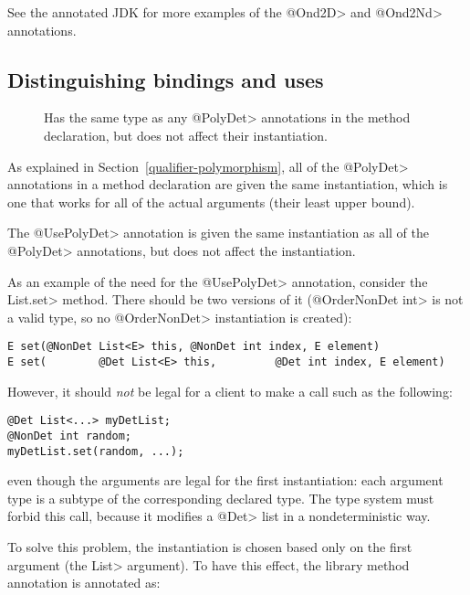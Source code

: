 See the annotated JDK for more examples of the \<@Ond2D> and \<@Ond2Nd>
annotations.


\subsection{Distinguishing bindings and uses\label{determinism-polymorphism-binding}}

\begin{description}
\item[]
  Has the same type as any \<@PolyDet> annotations in the method
  declaration, but does not affect their instantiation.
\end{description}

As explained in Section~\ref{qualifier-polymorphism},
all of the \<@PolyDet> annotations in a method declaration are given the same
instantiation, which is one that works for all of the actual arguments
(their least upper bound).

The \<@UsePolyDet> annotation is given the same instantiation as all of the
\<@PolyDet> annotations, but does not affect the instantiation.

As an example of the need for the \<@UsePolyDet> annotation, consider the
\<List.set> method.  There should be two versions of it (\<@OrderNonDet
int> is not a valid type, so no \<@OrderNonDet> instantiation is created):

\begin{Verbatim}
E set(@NonDet List<E> this, @NonDet int index, E element)
E set(        @Det List<E> this,         @Det int index, E element)
\end{Verbatim}

\noindent
However, it should \emph{not} be legal for a client to make a call such as
the following:

\begin{Verbatim}
@Det List<...> myDetList;
@NonDet int random;
myDetList.set(random, ...);
\end{Verbatim}

\noindent
even though the arguments are legal for the first instantiation:
each argument type is a subtype of the corresponding declared type.
The type system must forbid this call, because it modifies a
\<@Det> list in a nondeterministic way.

To solve this problem, the instantiation is chosen based only on the first
argument (the \<List> argument).  To have this effect, the library method
annotation is annotated as:

